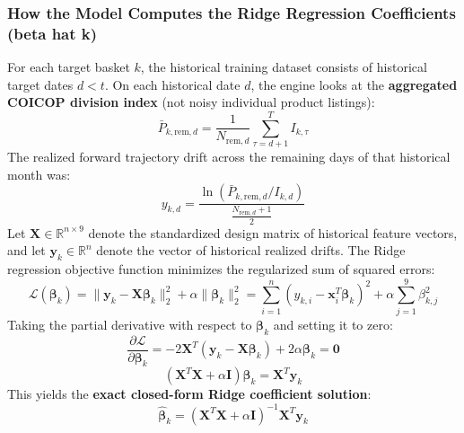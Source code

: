 \documentclass[11pt,a4paper,oneside]{article}
\begin{document}
\subsubsection{How the Model Computes the Ridge Regression Coefficients (beta hat k)}
For each target basket $k$, the historical training dataset consists of historical target dates $d < t$. On each historical date $d$, the engine looks at the \textbf{aggregated COICOP division index} (not noisy individual product listings):
\begin{equation}
\bar{P}_{k, \text{rem}, d} = \frac{1}{N_{\text{rem}, d}} \sum_{\tau=d+1}^{T} I_{k, \tau}
\end{equation}
The realized forward trajectory drift across the remaining days of that historical month was:
\begin{equation}
y_{k, d} = \frac{\ln\left( \bar{P}_{k, \text{rem}, d} / I_{k, d} \right)}{\frac{N_{\text{rem}, d} + 1}{2}}
\end{equation}
Let $\mathbf{X} \in \mathbb{R}^{n \times 9}$ denote the standardized design matrix of historical feature vectors, and let $\mathbf{y}_k \in \mathbb{R}^n$ denote the vector of historical realized drifts. The Ridge regression objective function minimizes the regularized sum of squared errors:
\begin{equation}
\mathcal{L}(\boldsymbol{\beta}_k) = \|\mathbf{y}_k - \mathbf{X}\boldsymbol{\beta}_k\|_2^2 + \alpha \|\boldsymbol{\beta}_k\|_2^2 = \sum_{i=1}^n \left( y_{k, i} - \mathbf{x}_i^T \boldsymbol{\beta}_k \right)^2 + \alpha \sum_{j=1}^9 \beta_{k, j}^2
\end{equation}
Taking the partial derivative with respect to $\boldsymbol{\beta}_k$ and setting it to zero:
\begin{equation}
\frac{\partial \mathcal{L}}{\partial \boldsymbol{\beta}_k} = -2 \mathbf{X}^T (\mathbf{y}_k - \mathbf{X}\boldsymbol{\beta}_k) + 2\alpha \boldsymbol{\beta}_k = \mathbf{0}
\end{equation}
\begin{equation}
\left( \mathbf{X}^T \mathbf{X} + \alpha \mathbf{I} \right) \boldsymbol{\beta}_k = \mathbf{X}^T \mathbf{y}_k
\end{equation}
This yields the \textbf{exact closed-form Ridge coefficient solution}:
\begin{equation}
\hat{\boldsymbol{\beta}}_k = \left( \mathbf{X}^T \mathbf{X} + \alpha \mathbf{I} \right)^{-1} \mathbf{X}^T \mathbf{y}_k
\end{equation}
\end{document}
